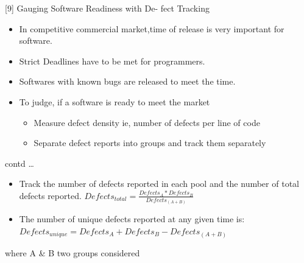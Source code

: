 \documentclass[xcolor=x11names,compress]{beamer}
\renewcommand{\(}{\begin{columns}}
\renewcommand{\)}{\end{columns}}
\newcommand{\<}[1]{\begin{column}{#1}}
\renewcommand{\>}{\end{column}}
\begin{document}
\begin{frame}{[9] Gauging Software Readiness with De-
		fect Tracking}
\begin{itemize}
	\item In competitive commercial market,time of release is very important for software.
	\item Strict Deadlines have to be met for programmers.
	\item Softwares with known bugs are released to meet the time.
	\newline
	\item To judge, if a software is ready to meet the market  
	\begin{itemize}
		\item Measure defect density ie, number of defects per line of code
		\item Separate defect reports into groups and track them separately
	\end{itemize}
\end{itemize}
\end{frame}
\begin{frame}{contd \dots}
	\begin{itemize}
		\item Track the number of defects reported in each pool and the number of total
		defects reported. \newline
		{ $ Defects_{total} = \frac{Defects_{ A} * Defects_{ B}}{Defects_{ (A+B)}} $}\newline
		\item The number of unique defects reported at any given time is: \newline
		 $ Defects_{ unique} = Defects _{A} +  Defects_{ B} - Defects_{ (A+B)} $
	\end{itemize}
	where A \& B two groups considered
\end{frame}
\end{document}

